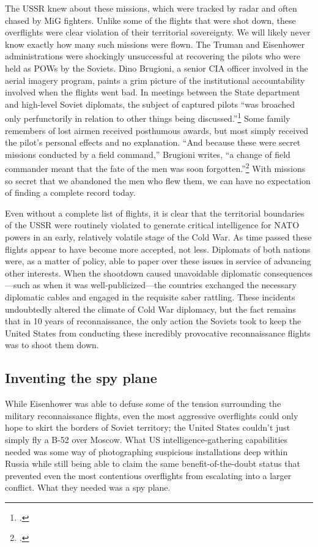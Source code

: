 \documentclass[14pt]{extarticle}
\begin{document}
The USSR knew about these missions, which were tracked by radar and often chased by MiG fighters. Unlike some of the flights that were shot down, these overflights were clear violation of their territorial sovereignty. We will likely never know exactly how many such missions were flown. The Truman and Eisenhower administrations were shockingly unsuccessful at recovering the pilots who were held as POWs by the Soviets. Dino Brugioni, a senior CIA officer involved in the aerial imagery program, paints a grim picture of the institutional accountability involved when the flights went bad. In meetings between the State department and high-level Soviet diplomats, the subject of captured pilots \enquote{was broached only perfunctorily in relation to other things being discussed.}\footcite[p.~72]{brugioni_eyes_2010} Some family remembers of lost airmen received posthumous awards, but most simply received the pilot's personal effects and no explanation. \enquote{And because these were secret missions conducted by a field command,} Brugioni writes, \enquote{a change of field commander meant that the fate of the men was soon forgotten.}\footcite[p.~72]{brugioni_eyes_2010} With missions so secret that we abandoned the men who flew them, we can have no expectation of finding a complete record today.

Even without a complete list of flights, it is clear that the territorial boundaries of the USSR were routinely violated to generate critical intelligence for NATO powers in an early, relatively volatile stage of the Cold War. As time passed these flights appear to have become more accepted, not less. Diplomats of both nations were, as a matter of policy, able to paper over these issues in service of advancing other interests. When the shootdown caused unavoidable diplomatic consequences---such as when it was well-publicized---the countries exchanged the necessary diplomatic cables and engaged in the requisite saber rattling. These incidents undoubtedly altered the climate of Cold War diplomacy, but the fact remains that in 10 years of reconnaissance, the only action the Soviets took to keep the United States from conducting these incredibly provocative reconnaissance flights was to shoot them down.

\subsection{Inventing the spy plane}
While Eisenhower was able to defuse some of the tension surrounding the military reconnaissance flights, even the most aggressive overflights could only hope to skirt the borders of Soviet territory; the United States couldn't just simply fly a B-52 over Moscow. What US intelligence-gathering capabilities needed was some way of photographing suspicious installations deep within Russia while still being able to claim the same benefit-of-the-doubt status that prevented even the most contentious overflights from escalating into a larger conflict. What they needed was a spy plane.
\end{document}
